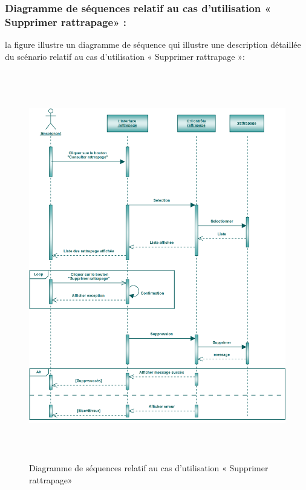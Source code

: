 \documentclass[12 pt ]{report}
\begin{document}
\subsubsection{Diagramme de séquences relatif au cas d’utilisation « Supprimer rattrapage» :}
la figure   illustre un diagramme de séquence qui illustre une description détaillée du scénario relatif au cas d’utilisation « Supprimer rattrapage »: 
\begin{figure}[h]
 \begin{center}
\includegraphics[width= 18 cm ,height=  17cm]{ssr.PNG}
\caption{Diagramme de séquences relatif au cas d’utilisation « Supprimer rattrapage»}

\end{center}
\end{figure}
\end{document}
